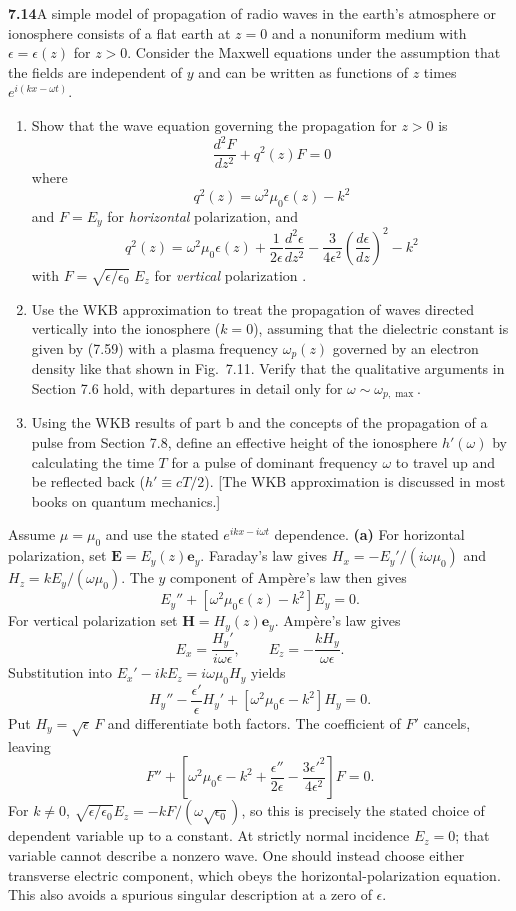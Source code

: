 \par\bigskip
\noindent\textbf{7.14}\quad A simple model of propagation of radio waves in the earth's atmosphere or ionosphere consists of a flat earth at $z=0$ and a nonuniform medium with $\epsilon=\epsilon(z)$ for $z>0$. Consider the Maxwell equations under the assumption that the fields are independent of $y$ and can be written as functions of $z$ times $e^{i(kx-\omega t)}$.
\begin{enumerate}
\item[(a)] Show that the wave equation governing the propagation for $z>0$ is
\[
\frac{d^{2}F}{dz^{2}}+q^{2}(z)F=0
\]
where
\[
q^{2}(z)=\omega^{2}\mu_{0}\epsilon(z)-k^{2}
\]
and $F=E_{y}$ for \emph{horizontal} polarization, and
\[
q^{2}(z)=\omega^{2}\mu_{0}\epsilon(z)+\frac{1}{2\epsilon}\frac{d^{2}\epsilon}{dz^{2}}-\frac{3}{4\epsilon^{2}}\left(\frac{d\epsilon}{dz}\right)^{2}-k^{2}
\]
with $F=\sqrt{\epsilon/\epsilon_{0}}\;E_{z}$ for \emph{vertical} polarization .
\item[(b)] Use the WKB approximation to treat the propagation of waves directed vertically into the ionosphere ($k=0$), assuming that the dielectric constant is given by (7.59) with a plasma frequency $\omega_{p}(z)$ governed by an electron density like that shown in Fig.~7.11. Verify that the qualitative arguments in Section 7.6 hold, with departures in detail only for $\omega\sim\omega_{p,\max}$.
\item[(c)] Using the WKB results of part b and the concepts of the propagation of a pulse from Section 7.8, define an effective height of the ionosphere $h'(\omega)$ by calculating the time $T$ for a pulse of dominant frequency $\omega$ to travel up and be reflected back ($h'\equiv cT/2$). [The WKB approximation is discussed in most books on quantum mechanics.]
\end{enumerate}
\solution
Assume $\mu=\mu_0$ and use the stated $e^{ikx-i\omega t}$ dependence.
\textbf{(a)} For horizontal polarization, set
$\mathbf E=E_y(z)\mathbf e_y$. Faraday's law gives
$H_x=-E_y'/(i\omega\mu_0)$ and $H_z=kE_y/(\omega\mu_0)$.
The $y$ component of Amp\`ere's law then gives
\[
E_y''+[\omega^2\mu_0\epsilon(z)-k^2]E_y=0.
\]
For vertical polarization set $\mathbf H=H_y(z)\mathbf e_y$.
Amp\`ere's law gives
\[
E_x=\frac{H_y'}{i\omega\epsilon},\qquad
E_z=-\frac{kH_y}{\omega\epsilon}.
\]
Substitution into $E_x'-ikE_z=i\omega\mu_0H_y$ yields
\[
H_y''-\frac{\epsilon'}\epsilon H_y'
+[\omega^2\mu_0\epsilon-k^2]H_y=0.
\]
Put $H_y=\sqrt\epsilon\,F$ and differentiate both factors. The
coefficient of $F'$ cancels, leaving
\[
\boxed{F''+\left[\omega^2\mu_0\epsilon-k^2
+\frac{\epsilon''}{2\epsilon}
-\frac{3\epsilon'^2}{4\epsilon^2}\right]F=0.}
\]
For $k\ne0$, $\sqrt{\epsilon/\epsilon_0}E_z
=-kF/(\omega\sqrt{\epsilon_0})$, so this is precisely the stated
choice of dependent variable up to a constant. At strictly normal
incidence $E_z=0$; that variable cannot describe a nonzero wave.
One should instead choose either transverse electric component,
which obeys the horizontal-polarization equation. This also avoids
a spurious singular description at a zero of $\epsilon$.

